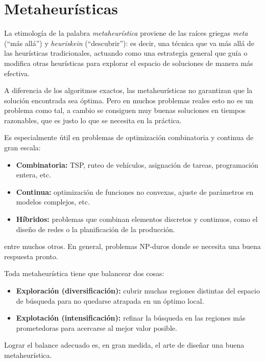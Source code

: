 \documentclass[12pt,letterpaper]{article}
\begin{document}
\section{Metaheurísticas}
\label{sec:meta}

La etimología de la palabra \emph{metaheurística} proviene de las raíces 
griegas \emph{meta} (``más allá'') y \emph{heuriskein} (``descubrir''): es 
decir, una técnica que va más allá de las heurísticas tradicionales, actuando 
como una estrategia general que guía o modifica otras heurísticas para explorar 
el espacio de soluciones de manera más efectiva.

A diferencia de los algoritmos exactos, las metaheurísticas no garantizan que 
la solución encontrada sea óptima. Pero en muchos problemas reales esto no es 
un problema como tal, a cambio se consiguen muy buenas soluciones en tiempos 
razonables, que es justo lo que se necesita en la práctica.

Es especialmente útil en problemas de optimización combinatoria y continua de 
gran escala: 

\begin{itemize}
    \item \textbf{Combinatoria:} TSP, ruteo de vehículos, asignación de tareas, 
    programación entera, etc.
    \item \textbf{Continua:} optimización de funciones no convexas, ajuste de 
    parámetros en modelos complejos, etc.
    \item \textbf{Híbridos:} problemas que combinan elementos discretos y 
    continuos, como el diseño de redes o la planificación de la producción.
\end{itemize}

entre muchos otros. En general, problemas \textsf{NP}-duros donde se necesita 
una buena respuesta pronto.

Toda metaheurística tiene que balancear dos cosas:
\begin{itemize}
    \item \textbf{Exploración (diversificación):} cubrir muchas regiones 
    distintas del espacio de búsqueda para no quedarse atrapada en un óptimo 
    local.
    \item \textbf{Explotación (intensificación):} refinar la búsqueda en las 
    regiones más prometedoras para acercarse al mejor valor posible.
\end{itemize}
Lograr el balance adecuado es, en gran medida, el arte de diseñar una buena 
metaheurística.
\end{document}
